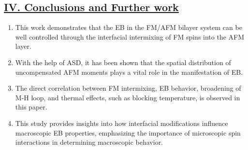 \subsection*{\underline{IV. Conclusions and Further work}}
\begin{enumerate}
    \item This work demonstrates that the EB in the FM/AFM bilayer system can be well controlled through the interfacial intermixing of FM spins into the AFM layer.
    \item With the help of ASD, it has been shown that the spatial distribution of uncompensated AFM moments plays a vital role in the manifestation of EB.
    \item The direct correlation between FM intermixing, EB behavior, broadening of M-H loop, and thermal effects, such as blocking temperature, is observed in this paper.
    \item This study provides insights into how interfacial modifications influence macroscopic EB properties, emphasizing the importance of microscopic spin interactions in determining macroscopic behavior.
\end{enumerate}
